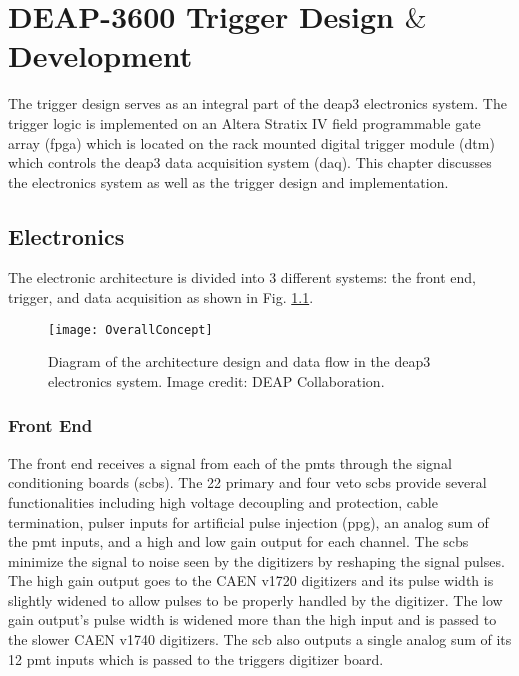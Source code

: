 \chapter{DEAP-3600 Trigger Design $\&$ Development}
\label{chap:triggerDesign}
The trigger design serves as an integral part of the \gls{deap3} electronics system. The trigger logic is implemented on an Altera Stratix IV field programmable gate array (\gls{fpga}) which is located on the rack mounted digital trigger module (\gls{dtm}) which controls the \gls{deap3} data acquisition system (\gls{daq}). This chapter discusses the electronics system as well as the trigger design and implementation.


\section{Electronics}
The electronic architecture is divided into 3 different systems: the front end, trigger, and data acquisition as shown in Fig. \ref{Fig:OverallConcept}.

\begin{figure}[ht]
\centering
\texttt{[image: OverallConcept]}
\caption{Diagram of the architecture design and data flow in the \gls{deap3} electronics system. Image credit: DEAP Collaboration.}
\label{Fig:OverallConcept}
\end{figure}

\subsection{Front End}
The front end receives a signal from each of the \gls{pmt}s through the signal conditioning boards (\gls{scb}s). The 22 primary and four veto \gls{scb}s provide several functionalities including high voltage decoupling and protection, cable termination, pulser inputs for artificial pulse injection (\gls{ppg}), an analog sum of the \gls{pmt} inputs, and a high and low gain output for each channel. The \gls{scb}s minimize the signal to noise seen by the digitizers by reshaping the signal pulses. The high gain output goes to the CAEN \gls{v1720} digitizers and its pulse width is slightly widened to allow pulses to be properly handled by the digitizer. The low gain output's pulse width is widened more than the high input and is passed to the slower CAEN \gls{v1740} digitizers. The \gls{scb} also outputs a single analog sum of its 12 \gls{pmt} inputs which is passed to the triggers digitizer board.

